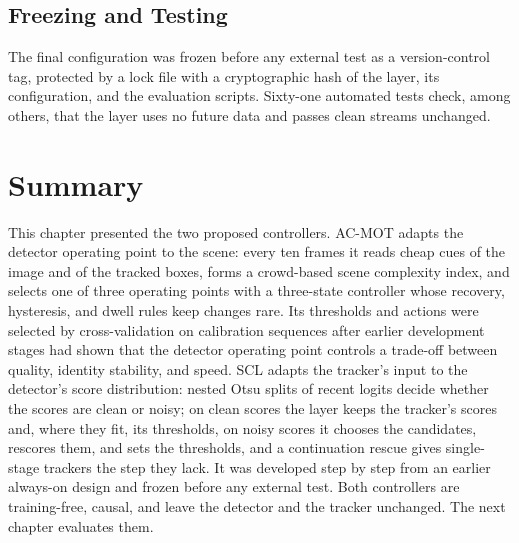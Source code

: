 \subsection{Freezing and Testing}\label{sec:scl-freeze}
The final configuration was frozen before any external test as a version-control tag, protected by a lock file with a cryptographic hash of the layer, its configuration, and the evaluation scripts. Sixty-one automated tests check, among others, that the layer uses no future data and passes clean streams unchanged.

\section{Summary}\label{sec:prop-summary}
This chapter presented the two proposed controllers. AC-MOT adapts the detector operating point to the scene: every ten frames it reads cheap cues of the image and of the tracked boxes, forms a crowd-based scene complexity index, and selects one of three operating points with a three-state controller whose recovery, hysteresis, and dwell rules keep changes rare. Its thresholds and actions were selected by cross-validation on calibration sequences after earlier development stages had shown that the detector operating point controls a trade-off between quality, identity stability, and speed. SCL adapts the tracker's input to the detector's score distribution: nested Otsu splits of recent logits decide whether the scores are clean or noisy; on clean scores the layer keeps the tracker's scores and, where they fit, its thresholds, on noisy scores it chooses the candidates, rescores them, and sets the thresholds, and a continuation rescue gives single-stage trackers the step they lack. It was developed step by step from an earlier always-on design and frozen before any external test. Both controllers are training-free, causal, and leave the detector and the tracker unchanged. The next chapter evaluates them.
